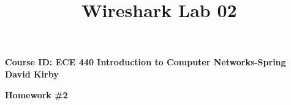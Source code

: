 \documentclass{article}
\title{Wireshark Lab 02}
\begin{document}
{
\center \Large \textbf{Course ID: ECE 440 Introduction to Computer Networks-Spring}
\center \Large \textbf{David Kirby}\par
\center \Large \textbf{Homework \#2}\par
}
\end{document}
